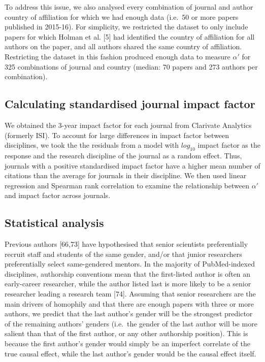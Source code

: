\documentclass[12pt,]{article}
\begin{document}
To address this issue, we also analysed every combination of journal and
author country of affiliation for which we had enough data (i.e.~50 or
more papers published in 2015-16). For simplicity, we restricted the
dataset to only include papers for which Holman et al. {[}5{]} had
identified the country of affiliation for all authors on the paper, and
all authors shared the same country of affiliation. Restricting the
dataset in this fashion produced enough data to measure \(\alpha'\) for
325 combinations of journal and country (median: 70 papers and 273
authors per combination).

\hypertarget{calculating-standardised-journal-impact-factor}{%
\subsection{Calculating standardised journal impact
factor}\label{calculating-standardised-journal-impact-factor}}

We obtained the 3-year impact factor for each journal from Clarivate
Analytics (formerly ISI). To account for large differences in impact
factor between disciplines, we took the the residuals from a model with
\(log_{10}\) impact factor as the response and the research discipline
of the journal as a random effect. Thus, journals with a positive
standardised impact factor have a higher mean number of citations than
the average for journals in their discipline. We then used linear
regression and Spearman rank correlation to examine the relationship
between \(\alpha'\) and impact factor across journals.

\hypertarget{statistical-analysis}{%
\subsection{Statistical analysis}\label{statistical-analysis}}

Previous authors {[}66,73{]} have hypothesised that senior scientists
preferentially recruit staff and students of the same gender, and/or
that junior researchers preferentially select same-gendered mentors. In
the majority of PubMed-indexed disciplines, authorship conventions mean
that the first-listed author is often an early-career researcher, while
the author listed last is more likely to be a senior researcher leading
a research team {[}74{]}. Assuming that senior researchers are the main
drivers of homophily and that there are enough papers with three or more
authors, we predict that the last author's gender will be the strongest
predictor of the remaining authors' genders (i.e.~the gender of the last
author will be more salient than that of the first author, or any other
authorship position). This is because the first author's gender would
simply be an imperfect correlate of the true causal effect, while the
last author's gender would be the causal effect itself.
\end{document}
